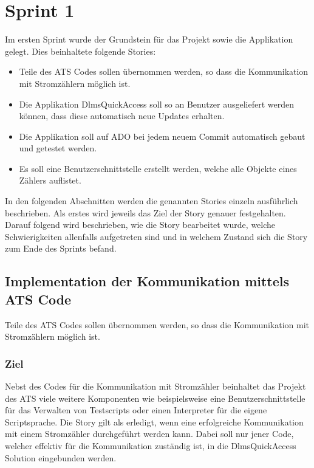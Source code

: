 \section{Sprint 1}\label{s1}
Im ersten Sprint wurde der Grundstein für das Projekt sowie die Applikation gelegt.
Dies beinhaltete folgende Stories:
\begin{itemize}
   \item Teile des \ac{ATS} Codes sollen übernommen werden, so dass die Kommunikation mit Stromzählern möglich ist.
   \item Die Applikation DlmsQuickAccess soll so an Benutzer ausgeliefert werden können, dass diese automatisch neue Updates erhalten.
   \item Die Applikation soll auf \ac{ADO} bei jedem neuem Commit automatisch gebaut und getestet werden. 
   \item Es soll eine Benutzerschnittstelle erstellt werden, welche alle Objekte eines Zählers auflistet.
\end{itemize}
In den folgenden Abschnitten werden die genannten Stories einzeln ausführlich beschrieben.
Als erstes wird jeweils das Ziel der Story genauer festgehalten.
Darauf folgend wird beschrieben, wie die Story bearbeitet wurde, welche Schwierigkeiten allenfalls aufgetreten sind und in welchem Zustand sich die Story zum Ende des Sprints befand.

\subsection{Implementation der Kommunikation mittels ATS Code}\label{s1:ats}
\dq Teile des \ac{ATS} Codes sollen übernommen werden, so dass die Kommunikation mit Stromzählern möglich ist.\dq

\subsubsection{Ziel}
Nebst des Codes für die Kommunikation mit Stromzähler beinhaltet das Projekt des \ac{ATS} viele weitere Komponenten wie beispielsweise eine Benutzerschnittstelle für das Verwalten von Testscripts oder einen Interpreter für die eigene Scriptsprache.
Die Story gilt als erledigt, wenn eine erfolgreiche Kommunikation mit einem Stromzähler durchgeführt werden kann.
Dabei soll nur jener Code, welcher effektiv für die Kommunikation zuständig ist, in die DlmsQuickAccess Solution eingebunden werden. 


